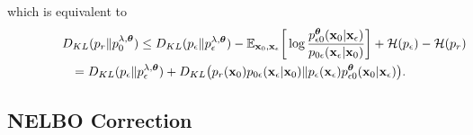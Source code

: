 \documentclass{article}
\theoremstyle{definition}
\theoremstyle{remark}
\begin{document}
	which is equivalent to
	\begin{eqnarray*}
		\lefteqn{D_{KL}(p_{r}\Vert p_{0}^{\lambda,\bm{\theta}})\le D_{KL}(p_{\epsilon}\Vert p_{\epsilon}^{\lambda,\bm{\theta}})-\mathbb{E}_{\mathbf{x}_{0},\mathbf{x}_{\epsilon}}\bigg[\log{\frac{p_{\epsilon 0}^{\bm{\theta}}(\mathbf{x}_{0}\vert\mathbf{x}_{\epsilon})}{p_{0\epsilon}(\mathbf{x}_{\epsilon}\vert\mathbf{x}_{0})}}\bigg]+\mathcal{H}(p_{\epsilon})-\mathcal{H}(p_{r})}&\\
		&&=D_{KL}(p_{\epsilon}\Vert p_{\epsilon}^{\lambda,\bm{\theta}})+D_{KL}\big(p_{r}(\mathbf{x}_{0})p_{0\epsilon}(\mathbf{x}_{\epsilon}\vert\mathbf{x}_{0})\Vert p_{\epsilon}(\mathbf{x}_{\epsilon})p_{\epsilon 0}^{\bm{\theta}}(\mathbf{x}_{0}\vert\mathbf{x}_{\epsilon})\big).
	\end{eqnarray*}
	
	\subsection{NELBO Correction}
	
\end{document}
